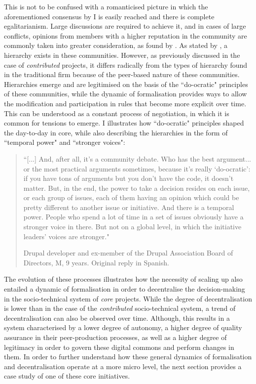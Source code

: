 This is not to be confused with a romanticised picture in which the aforementioned consensus by I is easily reached and there is complete egalitarianism. Large discussions are required to achieve it, and in cases of large conflicts, opinions from members with a higher reputation in the community are commonly taken into greater consideration, as found by \textcite{Zilouchian2011}. As stated by \textcite[67]{benkler2006wealth}, a hierarchy exists in these communities. However, as previously discussed in the case of \textit{contributed} projects, it differs radically from the types of hierarchy found in the traditional firm because of the peer-based nature of these communities. Hierarchies emerge and are legitimised on the basis of the ``do-ocratic" principles of these communities, while the dynamic of formalisation provides ways to allow the modification and participation in rules that become more explicit over time. This can be understood as a constant process of negotiation, in which it is common for tensions to emerge. I illustrates how ``do-ocratic" principles shaped the day-to-day in core, while also describing the hierarchies in the form of ``temporal power" and ``stronger voices":

\begin{quotation}
    ``[...] And, after all, it's a community debate. Who has the best argument... or the most practical arguments sometimes, because it's really `do-ocratic': if you have tons of arguments but you don't have the code, it doesn't matter. But, in the end, the power to take a decision resides on each issue, or each group of issues, each of them having an opinion which could be pretty different to another issue or initiative. And there is a temporal power. People who spend a lot of time in a set of issues obviously have a stronger voice in there. But not on a global level, in which the initiative leaders' voices are stronger."

\begin{flushright}\footnotesize{Drupal developer and ex-member of the Drupal Association Board of Directors, M, 9 years. Original reply in Spanish.}\end{flushright}
\end{quotation}

The evolution of these processes illustrates how the necessity of scaling up also entailed a dynamic of formalisation in order to decentralise the decision-making in the socio-technical system of \textit{core} projects. While the degree of decentralisation is lower than in the case of the \textit{contributed} socio-technical system, a trend of decentralisation can also be observed over time. Although, this results in a system characterised by a lower degree of autonomy, a higher degree of quality assurance in their peer-production processes, as well as a higher degree of legitimacy in order to govern these digital commons and perform changes in them. In order to further understand how these general dynamics of formalisation and decentralisation operate at a more micro level, the next section provides a case study of one of these core initiatives.

